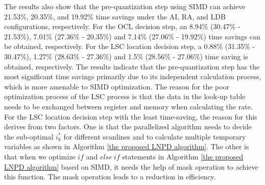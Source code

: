 \documentclass[lettersize,journal]{IEEEtran}
\begin{document}
The results also show that the pre-quantization step using SIMD can achieve 21.53\%, 20.35\%, and 19.92\% time savings under the AI, RA, and LDB configurations, respectively. For the OCL decision step, an 8.94\% (30.47\% - 21.53\%), 7.01\% (27.36\% - 20.35\%) and 7.14\% (27.06\% - 19.92\%) time savings can be obtained, respectively. For the LSC location decision step, a 0.88\% (31.35\% - 30.47\%), 1.27\% (28.63\% - 27.36\%) and 1.5\% (28.56\% - 27.06\%) time saving is obtained, respectively. The results indicate that the pre-quantization step has the most significant time savings primarily due to its independent calculation process, which is more amenable to SIMD optimization. The reason for the poor optimization process of the LSC process is that the data in the look-up table needs to be exchanged between register and memory when calculating the rate. For the LSC location decision step with the least time-saving, the reason for this derives from two factors. One is that the parallelized algorithm needs to decide the sub-optimal $i_{k}^{*}$ for different scanlines and to calculate multiple temporary variables as shown in Algorithm \ref{the proposed LNPD algorithm}. The other is that when we optimize $if$ and $else\ if$ statements in Algorithm \ref{the proposed LNPD algorithm} based on SIMD, it needs the help of mask operation to achieve this function. The mask operation leads to a reduction in efficiency. 
\end{document}
